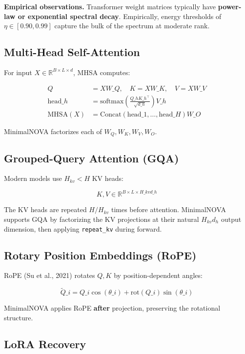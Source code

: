 \textbf{Empirical observations.} Transformer weight matrices typically have 
\textbf{power-law or exponential spectral decay}. Empirically, energy thresholds 
of $\eta \in [0.90, 0.99]$ capture the bulk of the spectrum at moderate rank.

\subsection{Multi-Head Self-Attention}

For input $X \in \mathbb{R}^{B \times L \times d}$, MHSA computes:

\[
\begin{aligned}
Q &= X W\_Q, \quad K = X W\_K, \quad V = X W\_V \\
\text{head}\_h &= \text{softmax}\!\left(\frac{Q\_h K\_h^\top}{\sqrt{d\_h}}\right) V\_h \\
\text{MHSA}(X) &= \text{Concat}(\text{head}\_1, \dots, \text{head}\_H) W\_O
\end{aligned}
\tag{3.7}
\]

MinimalNOVA factorizes each of $W_Q, W_K, W_V, W_O$.

\subsection{Grouped-Query Attention (GQA)}

Modern models use $H_{kv} < H$ KV heads:

\[
K, V \in \mathbb{R}^{B \times L \times H\_{kv} d\_h}
\tag{3.8}
\]

The KV heads are repeated $H/H_{kv}$ times before attention. MinimalNOVA 
supports GQA by factorizing the KV projections at their natural 
$H_{kv} d_h$ output dimension, then applying \texttt{repeat\_kv} during forward.

\subsection{Rotary Position Embeddings (RoPE)}

RoPE (Su et al., 2021) rotates $Q, K$ by position-dependent angles:

\[
\tilde{Q}\_i = Q\_i \cos(\theta\_i) + \text{rot}(Q\_i) \sin(\theta\_i)
\tag{3.9}
\]

MinimalNOVA applies RoPE \textbf{after} projection, preserving the rotational 
structure.

\subsection{LoRA Recovery}

